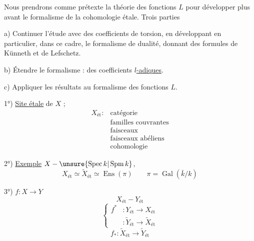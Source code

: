 Nous prendrons comme prétexte la théorie des fonctions $L$ pour développer plus avant le formalisme de la cohomologie étale. Trois parties

a) Continuer l'étude  avec des coefficients de torsion, en développant en particulier, dans ce cadre,    le formalisme de dualité,  donnant des formules de Künneth et de Lefschetz.

b) Étendre le formalisme : des coefficients \uline{$l$-adiques}.

c) Appliquer les résultats au formalisme des fonctions $L$.

1°) \uline{Site étale} de $X$ ;
\[
\begin{array}{ll}
X_{\mathrm{ét}} : & \text{catégorie}\\
&\text{familles couvrantes}\\
&\text{faisceaux}\\
&\text{faisceaux abéliens}\\
&\text{cohomologie}
\end{array}
\]

2°) \uline{Exemple} $X-\unsure{\operatorname{Spec}k|\operatorname{Spm}k}$,
\[
X_{\mathrm{ét}}\simeq\widetilde X_{\mathrm{ét}}\simeq\operatorname{Ens}(\pi)
\qquad \pi=\operatorname{Gal}(\bar k/k)
\]

3°) $f:X\longrightarrow Y$ 
\[
X_{\mathrm{ét}}-Y_{\mathrm{ét}}
\]
\[
\left\{\begin{aligned}
f^* &:Y_{\mathrm{ét}}\longrightarrow X_{\mathrm{ét}}\\
&:\widetilde Y_{\mathrm{ét}}\longrightarrow\widetilde X_{\mathrm{ét}}
\end{aligned}\right.
\]
\[
f_* :\widetilde X_{\mathrm{ét}}\longrightarrow\widetilde Y_{\mathrm{ét}}
\]

